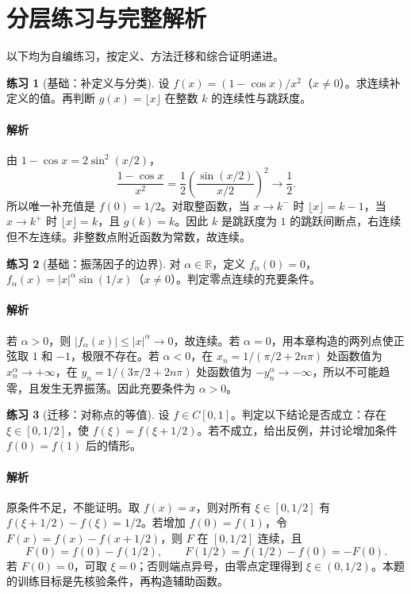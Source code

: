 \documentclass[UTF8,fontset=fandol,12pt,oneside,openany]{ctexrep}
\newcommand{\R}{\mathbb R}
\theoremstyle{definition}
\newtheorem{exercise}{练习}[chapter]
\begin{document}
\section{分层练习与完整解析}
\label{lec:04:exercises}
以下均为自编练习，按定义、方法迁移和综合证明递进。

\begin{exercise}[基础：补定义与分类]
设 $f(x)=(1-\cos x)/x^2$（$x\ne0$）。求连续补定义的值。再判断 $g(x)=\lfloor x\rfloor$ 在整数 $k$ 的连续性与跳跃度。
\end{exercise}
\paragraph{解析}
由 $1-\cos x=2\sin^2(x/2)$，
\[
 \frac{1-\cos x}{x^2}=\frac12\left(\frac{\sin(x/2)}{x/2}\right)^2\to\frac12.
\]
所以唯一补充值是 $f(0)=1/2$。对取整函数，当 $x\to k^-$ 时 $\lfloor x\rfloor=k-1$，当 $x\to k^+$ 时 $\lfloor x\rfloor=k$，且 $g(k)=k$。因此 $k$ 是跳跃度为 $1$ 的跳跃间断点，右连续但不左连续。非整数点附近函数为常数，故连续。

\begin{exercise}[基础：振荡因子的边界]
对 $\alpha\in\R$，定义 $f_\alpha(0)=0$，$f_\alpha(x)=|x|^\alpha\sin(1/x)$（$x\ne0$）。判定零点连续的充要条件。
\end{exercise}
\paragraph{解析}
若 $\alpha>0$，则 $|f_\alpha(x)|\le |x|^\alpha\to0$，故连续。若 $\alpha=0$，用本章构造的两列点使正弦取 $1$ 和 $-1$，极限不存在。若 $\alpha<0$，在 $x_n=1/(\pi/2+2n\pi)$ 处函数值为 $x_n^\alpha\to+\infty$，在 $y_n=1/(3\pi/2+2n\pi)$ 处函数值为 $-y_n^\alpha\to-\infty$，所以不可能趋零，且发生无界振荡。因此充要条件为 $\alpha>0$。

\begin{exercise}[迁移：对称点的等值]
设 $f\in C[0,1]$。判定以下结论是否成立：存在 $\xi\in[0,1/2]$，使 $f(\xi)=f(\xi+1/2)$。若不成立，给出反例，并讨论增加条件 $f(0)=f(1)$ 后的情形。
\end{exercise}
\paragraph{解析}
原条件不足，不能证明。取 $f(x)=x$，则对所有 $\xi\in[0,1/2]$ 有 $f(\xi+1/2)-f(\xi)=1/2$。若增加 $f(0)=f(1)$，令 $F(x)=f(x)-f(x+1/2)$，则 $F$ 在 $[0,1/2]$ 连续，且
\[
 F(0)=f(0)-f(1/2),\qquad F(1/2)=f(1/2)-f(0)=-F(0).
\]
若 $F(0)=0$，可取 $\xi=0$；否则端点异号，由零点定理得到 $\xi\in(0,1/2)$。本题的训练目标是先核验条件，再构造辅助函数。
\end{document}
